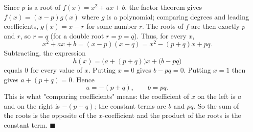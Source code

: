 Since $p$ is a root of $f(x)=x^2+ax+b$, the factor theorem gives $f(x)=(x-p)g(x)$ where $g$ is a polynomial; comparing degrees and leading coefficients, $g(x)=x-r$ for some number $r$. The roots of $f$ are then exactly $p$ and $r$, so $r=q$ (for a double root $r=p=q$). Thus, for every $x$,
\[x^2+ax+b=(x-p)(x-q)=x^2-(p+q)x+pq .\]
Subtracting, the expression
\[h(x)=\bigl(a+(p+q)\bigr)x+\bigl(b-pq\bigr)\]
equals $0$ for every value of $x$. Putting $x=0$ gives $b-pq=0$. Putting $x=1$ then gives $a+(p+q)=0$. Hence
\[a=-(p+q),\qquad b=pq .\]
This is what "comparing coefficients" means: the coefficient of $x$ on the left is $a$ and on the right is $-(p+q)$; the constant terms are $b$ and $pq$. So the sum of the roots is the opposite of the $x$-coefficient and the product of the roots is the constant term. $\blacksquare$
